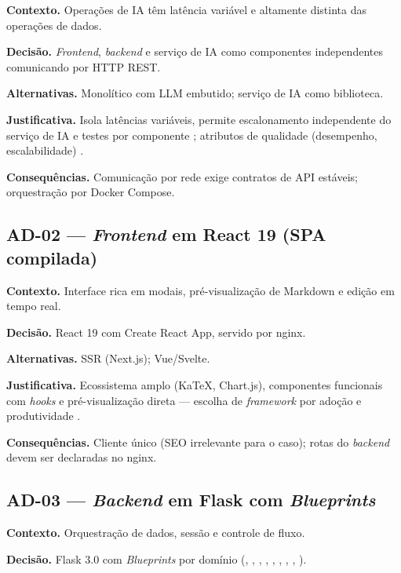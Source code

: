 \textbf{Contexto.} Operações de IA têm latência variável e altamente distinta das operações de dados.

\textbf{Decisão.} \emph{Frontend}, \emph{backend} e serviço de IA como componentes independentes comunicando por HTTP REST.

\textbf{Alternativas.} Monolítico com LLM embutido; serviço de IA como biblioteca.

\textbf{Justificativa.} Isola latências variáveis, permite escalonamento independente do serviço de IA e testes por componente \cite{newman_2015}; atributos de qualidade (desempenho, escalabilidade) \cite{bass_clements_kazman_2021}.

\textbf{Consequências.} Comunicação por rede exige contratos de API estáveis; orquestração por Docker Compose.

\subsection{AD-02 --- \emph{Frontend} em React 19 (SPA compilada)}

\textbf{Contexto.} Interface rica em modais, pré-visualização de Markdown e edição em tempo real.

\textbf{Decisão.} React 19 com Create React App, servido por nginx.

\textbf{Alternativas.} SSR (Next.js); Vue/Svelte.

\textbf{Justificativa.} Ecossistema amplo (KaTeX, Chart.js), componentes funcionais com \emph{hooks} e pré-visualização direta --- escolha de \emph{framework} por adoção e produtividade \cite{pressman_maxim_2014}.

\textbf{Consequências.} Cliente único (SEO irrelevante para o caso); rotas do \emph{backend} devem ser declaradas no nginx.

\subsection{AD-03 --- \emph{Backend} em Flask com \emph{Blueprints}}

\textbf{Contexto.} Orquestração de dados, sessão e controle de fluxo.

\textbf{Decisão.} Flask 3.0 com \emph{Blueprints} por domínio (\texttt{}, \texttt{}, \texttt{}, \texttt{}, \texttt{}, \texttt{}, \texttt{}, \texttt{}, \texttt{}).

